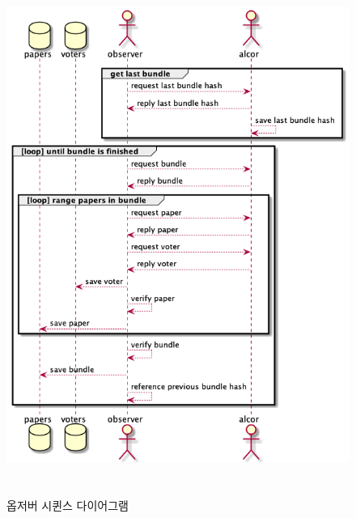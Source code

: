 \documentclass[8pt,a4paper,left=8mm,right=8mm,top=10mm,bottom=10mm]{article}
\begin{document}
    \begin{figure}[h]
        \begin{center}
            \includegraphics[height=17cm]{observer-verify.png}
            \caption{옵저버 시퀸스 다이어그램}
        \end{center}
    \end{figure}
\end{document}
